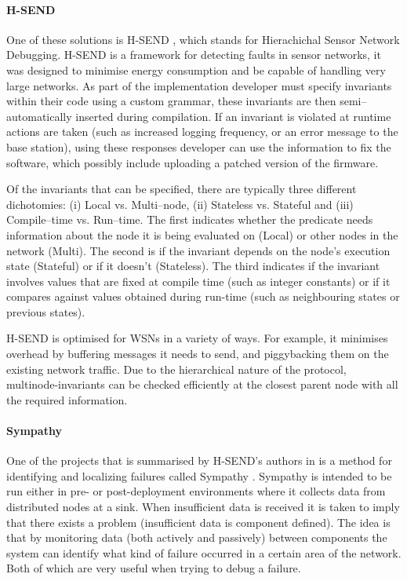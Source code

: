 \paragraph{H-SEND} One of these solutions is H-SEND \cite{herbert2007adaptive}, which stands for Hierachichal Sensor Network Debugging. H-SEND is a framework for detecting faults in sensor networks, it was designed to minimise energy consumption and be capable of handling very large networks. As part of the implementation developer must specify invariants within their code using a custom grammar, these invariants are then semi--automatically inserted during compilation. If an invariant is violated at runtime actions are taken (such as increased logging frequency, or an error message to the base station), using these responses developer can use the information to fix the software, which possibly include uploading a patched version of the firmware.

Of the invariants that can be specified, there are typically three different dichotomies: (i) Local vs. Multi--node, (ii) Stateless vs. Stateful and (iii) Compile--time vs. Run--time. The first indicates whether the predicate needs information about the node it is being evaluated on (Local) or other nodes in the network (Multi). The second is if the invariant depends on the node's execution state (Stateful) or if it doesn't (Stateless). The third indicates if the invariant involves values that are fixed at compile time (such as integer constants) or if it compares against values obtained during run-time (such as neighbouring states or previous states).

H-SEND is optimised for WSNs in a variety of ways. For example, it minimises overhead by buffering messages it needs to send, and piggybacking them on the existing network traffic. Due to the hierarchical nature of the protocol, multinode-invariants can be checked efficiently at the closest parent node with all the required information.

\paragraph{Sympathy} One of the projects that is summarised by H-SEND's authors \citeauthor{herbert2007adaptive} in \cite{herbert2007adaptive} is a method for identifying and localizing failures called Sympathy \cite{ramanathan2005sympathy}. Sympathy is intended to be run either in pre- or post-deployment environments where it collects data from distributed nodes at a sink. When insufficient data is received it is taken to imply that there exists a problem (insufficient data is component defined). The idea is that by monitoring data (both actively and passively) between components the system can identify what kind of failure occurred in a certain area of the network. Both of which are very useful when trying to debug a failure.

